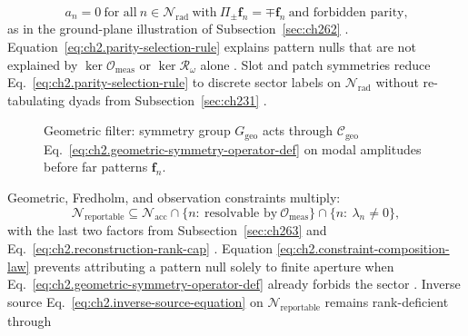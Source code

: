 \begin{equation}
\label{eq:ch2.parity-selection-rule}
a_n=0\ \text{for all}\ n\in\mathcal{N}_{\mathrm{rad}}
\ \text{with}\ 
\Pi_\pm\mathbf{f}_n=\mp\mathbf{f}_n
\ \text{and forbidden parity,}
\end{equation}
as in the ground-plane illustration of Subsection~\ref{sec:ch262}
\cite{stratton1941}. Equation~\eqref{eq:ch2.parity-selection-rule} explains
pattern nulls that are not explained by \(\ker\mathcal{O}_{\mathrm{meas}}\) or
\(\ker\mathcal{R}_\omega\) alone \cite{stratton1941}. Slot and patch symmetries reduce
Eq.~\eqref{eq:ch2.parity-selection-rule} to discrete sector labels on
\(\mathcal{N}_{\mathrm{rad}}\) without re-tabulating dyads from Subsection~\ref{sec:ch231}
\cite{harrington2001}.
\begin{figure}[t]
\centering
{}
\caption{Geometric filter: symmetry group \(G_{\mathrm{geo}}\)
acts through \(\mathcal{C}_{\mathrm{geo}}\) Eq.~\eqref{eq:ch2.geometric-symmetry-operator-def}
on modal amplitudes before far patterns \(\mathbf{f}_n\).}
\label{fig:ch2.geometric-spectrum-constraints}
\end{figure}
Geometric, Fredholm, and observation constraints multiply:
\begin{equation}
\label{eq:ch2.constraint-composition-law}
\mathcal{N}_{\mathrm{reportable}}
\subseteq
\mathcal{N}_{\mathrm{acc}}
\cap
\{n:\ \text{resolvable by}\ \mathcal{O}_{\mathrm{meas}}\}
\cap
\{n:\ \lambda_n\neq 0\},
\end{equation}
with the last two factors from Subsection~\ref{sec:ch263} and
Eq.~\eqref{eq:ch2.reconstruction-rank-cap} \cite{stratton1941}. Equation
\eqref{eq:ch2.constraint-composition-law} prevents attributing a pattern null solely to
finite aperture when Eq.~\eqref{eq:ch2.geometric-symmetry-operator-def} already forbids the
sector \cite{stratton1941}. Inverse source Eq.~\eqref{eq:ch2.inverse-source-equation} on
\(\mathcal{N}_{\mathrm{reportable}}\) remains rank-deficient through
